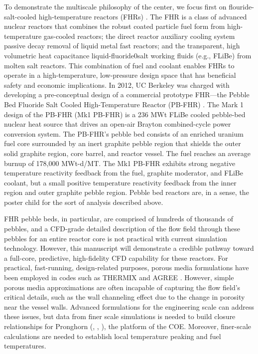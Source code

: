 To demonstrate the multiscale philosophy of the center, we focus first on flouride-salt-cooled high-temperature reactors (FHRs) \cite{forsberg2015fluoride}.
The FHR is a class of advanced nuclear reactors that combines the robust coated particle fuel form from high-temperature gas-cooled reactors; the direct reactor auxiliary cooling system passive decay removal of liquid metal fast reactors; and the transparent, high volumetric heat capacitance liquid-fluoride0salt working fluids (e.g., FLiBe) from molten salt reactors. 
This combination of fuel and coolant enables FHRs to operate in a high-temperature, low-pressure design space that has beneficial safety and economic implications. In 2012, UC Berkeley was charged with developing a pre-conceptual design of a commercial prototype FHR---the Pebble Bed Fluoride Salt Cooled High-Temperature Reactor (PB-FHR) \cite{cisneros2014technical}. The Mark 1 design of the PB-FHR (Mk1 PB-FHR) is a 236 MWt FLiBe cooled pebble-bed nuclear heat source that drives an open-air Brayton combined-cycle power conversion system. The PB-FHR's pebble bed consists of an enriched uranium fuel core surrounded by an inert graphite pebble region that shields the outer solid graphite region, core barrel, and reactor vessel. The fuel reaches an average burnup of 178,000 MWt-d/MT. The Mk1 PB-FHR exhibits strong negative temperature reactivity feedback from the fuel, graphite moderator, and FLiBe coolant, but a small positive temperature reactivity feedback from the inner region and outer graphite pebble region. Pebble bed reactors are, in a sense, the poster child for the sort of analysis described above.

FHR pebble beds, in particular, are comprised of hundreds of thousands of pebbles, and a CFD-grade detailed description of the flow field through these pebbles for an entire reactor core is not practical with current simulation technology. However, this manuscript will demonstrate a credible pathway toward a full-core, predictive, high-fidelity CFD capability for these reactors. For practical, fast-running, design-related purposes, porous media formulations have been employed in codes such as THERMIX \cite{cleveland1986application} and AGREE \cite{seker2007multiphysics}. However, simple porous media approximations are often incapable of capturing the flow field's critical details, such as the wall channeling effect due to the change in porosity near the vessel walls.  Advanced formulations for the engineering scale can address these issues, but data from finer scale simulations is needed to build closure relationships for Pronghorn (\cite{novak2018pronghorn}, \cite{novak1}, \cite{novak2}), the platform of the COE. Moreover, finer-scale calculations are needed to establish local temperature peaking and fuel temperatures.

